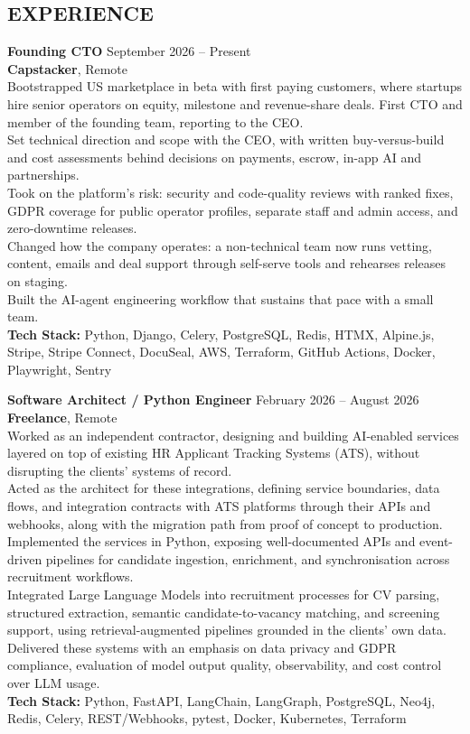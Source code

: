 \documentclass[margin, 10pt]{res} %
\newcommand{\jobheader}[4]{%
    \textbf{#1} \hfill #4\\
    \textbf{#2}, #3%
}
\newcommand{\jobentry}[6]{%
    \jobheader{#1}{#2}{#3}{#4}\\
    #5\\
    \textbf{Tech Stack:} #6
}
\begin{document}
\begin{resume}
    \section{EXPERIENCE}

    \jobentry{Founding CTO}{Capstacker}{Remote}{September 2026 -- Present}{%
Bootstrapped US marketplace in beta with first paying customers, where startups hire senior operators on equity, milestone and revenue-share deals. First CTO and member of the founding team, reporting to the CEO.\\
Set technical direction and scope with the CEO, with written buy-versus-build and cost assessments behind decisions on payments, escrow, in-app AI and partnerships.\\
Took on the platform's risk: security and code-quality reviews with ranked fixes, GDPR coverage for public operator profiles, separate staff and admin access, and zero-downtime releases.\\
Changed how the company operates: a non-technical team now runs vetting, content, emails and deal support through self-serve tools and rehearses releases on staging.\\
Built the AI-agent engineering workflow that sustains that pace with a small team.%
}{Python, Django, Celery, PostgreSQL, Redis, HTMX, Alpine.js, Stripe, Stripe Connect, DocuSeal, AWS, Terraform, GitHub Actions, Docker, Playwright, Sentry}


    \jobentry{Software Architect / Python Engineer}{Freelance}{Remote}{February 2026 -- August 2026}{%
Worked as an independent contractor, designing and building AI-enabled services layered on top of existing HR Applicant Tracking Systems (ATS), without disrupting the clients' systems of record.\\
Acted as the architect for these integrations, defining service boundaries, data flows, and integration contracts with ATS platforms through their APIs and webhooks, along with the migration path from proof of concept to production.\\
Implemented the services in Python, exposing well-documented APIs and event-driven pipelines for candidate ingestion, enrichment, and synchronisation across recruitment workflows.\\
Integrated Large Language Models into recruitment processes for CV parsing, structured extraction, semantic candidate-to-vacancy matching, and screening support, using retrieval-augmented pipelines grounded in the clients' own data.\\
Delivered these systems with an emphasis on data privacy and GDPR compliance, evaluation of model output quality, observability, and cost control over LLM usage.%
}{Python, FastAPI, LangChain, LangGraph, PostgreSQL, Neo4j, Redis, Celery, REST/Webhooks, pytest, Docker, Kubernetes, Terraform}



\end{resume}
\end{document}
